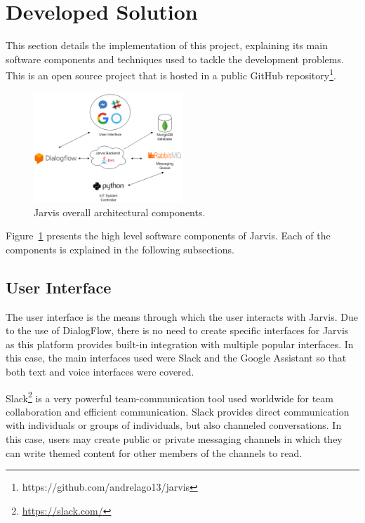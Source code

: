 \documentclass[runningheads]{llncs}
\begin{document}
\section{Developed Solution}

This section details the implementation of this project, explaining its main software components and techniques used to tackle the development problems. This is an open source project that is hosted in a public GitHub repository\footnote{https://github.com/andrelago13/jarvis}.

\begin{figure}
    \begin{center}
        \includegraphics[width=0.5\textwidth]{figures/architecture.png}
        \caption{Jarvis overall architectural components.} \label{fig:architecture}
    \end{center}
\end{figure}

Figure~\ref{fig:architecture} presents the high level software components of Jarvis. Each of the components is explained in the following subsections.

\subsection{User Interface}

The user interface is the means through which the user interacts with Jarvis. Due to the use of DialogFlow, there is no need to create specific interfaces for Jarvis as this platform provides built-in integration with multiple popular interfaces. In this case, the main interfaces used were Slack and the Google Assistant so that both text and voice interfaces were covered.

Slack\footnote{\url{https://slack.com/}} is a very powerful team-communication tool used worldwide for team collaboration and efficient communication. Slack provides direct communication with individuals or groups of individuals, but also channeled conversations. In this case, users may create public or private messaging channels in which they can write themed content for other members of the channels to read.
\end{document}
